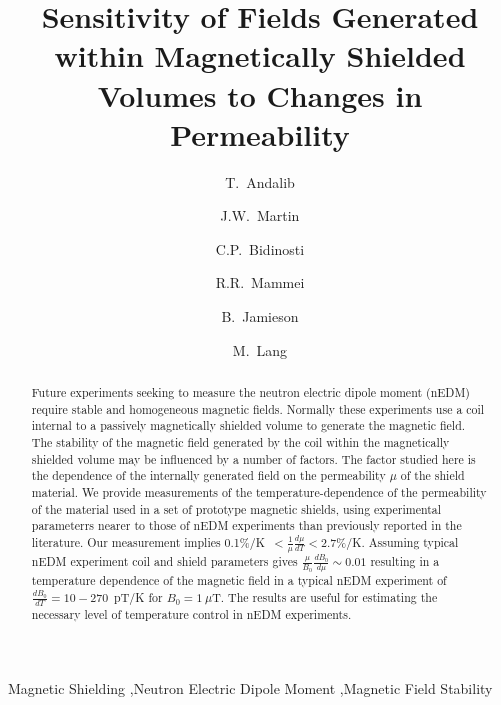 \documentclass[review,number,sort&compress]{elsarticle}
\begin{document}
\begin{frontmatter}

\title{Sensitivity of Fields Generated within Magnetically Shielded
  Volumes to Changes in Permeability}

\author[manitoba]{T.~Andalib}
\author[winnipeg,manitoba]{J.W.~Martin}
\author[winnipeg,manitoba]{C.P.~Bidinosti}
\author[winnipeg,manitoba]{R.R.~Mammei}
\author[winnipeg,manitoba]{B.~Jamieson}
\author[manitoba]{M.~Lang}



\address[winnipeg]{Physics Department, The University of Winnipeg, 515 Portage Avenue, Winnipeg, MB, R3B 2E9, Canada}
\address[manitoba]{Department of Physics and Astronomy, University of Manitoba, Winnipeg, MB R3T 2N2, Canada}


\begin{abstract}
Future experiments seeking to measure the neutron electric dipole
moment (nEDM) require stable and homogeneous magnetic fields.
Normally these experiments use a coil internal to a passively
magnetically shielded volume to generate the magnetic field.  The
stability of the magnetic field generated by the coil within the
magnetically shielded volume may be influenced by a number of factors.
The factor studied here is the dependence of the internally generated
field on the permeability $\mu$ of the shield material.  We provide
measurements of the temperature-dependence of the permeability of the
material used in a set of prototype magnetic shields, using
experimental parameterrs nearer to those of nEDM experiments than
previously reported in the literature.  Our measurement implies
0.1\%/K~$<\frac{1}{\mu}\frac{d\mu}{dT}<2.7$\%/K. Assuming typical nEDM
experiment coil and shield parameters gives
$\frac{\mu}{B_0}\frac{dB_0}{d\mu}\sim 0.01$ resulting in a temperature
dependence of the magnetic field in a typical nEDM experiment of
$\frac{dB_0}{dT}=10-270$~pT/K for $B_0=1~\mu$T.  The results are
useful for estimating the necessary level of temperature control in
nEDM experiments.
\end{abstract}

\begin{keyword}
Magnetic Shielding \sep Neutron Electric Dipole Moment \sep Magnetic Field Stability
\end{keyword}

\end{frontmatter}
\end{document}
